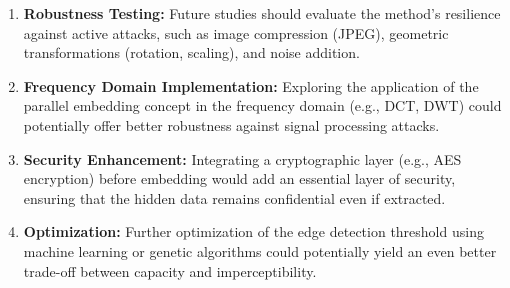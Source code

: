 \begin{enumerate}
    \item \textbf{Robustness Testing:} Future studies should evaluate the method's resilience against active attacks, such as image compression (JPEG), geometric transformations (rotation, scaling), and noise addition.
    \item \textbf{Frequency Domain Implementation:} Exploring the application of the parallel embedding concept in the frequency domain (e.g., DCT, DWT) could potentially offer better robustness against signal processing attacks.
    \item \textbf{Security Enhancement:} Integrating a cryptographic layer (e.g., AES encryption) before embedding would add an essential layer of security, ensuring that the hidden data remains confidential even if extracted.
    \item \textbf{Optimization:} Further optimization of the edge detection threshold using machine learning or genetic algorithms could potentially yield an even better trade-off between capacity and imperceptibility.
\end{enumerate}
